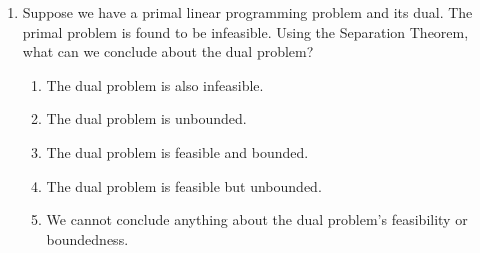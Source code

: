 \documentclass{article}%
\begin{document}
\begin{enumerate}
\begin{enumerate}
\item The dual problem must have an unbounded objective function.%
\item The dual problem must have a unique optimal solution.%
\item The dual problem must be either infeasible or have an unbounded objective function.%
\item The dual problem must have a finite optimal objective function value.%
\end{enumerate}%
\vspace{1em}%
\item Suppose we have a primal linear programming problem and its dual.  The primal problem is found to be infeasible. Using the Separation Theorem, what can we conclude about the dual problem?%
\begin{enumerate}%
\item The dual problem is also infeasible.%
\item The dual problem is unbounded.%
\item The dual problem is feasible and bounded.%
\item The dual problem is feasible but unbounded.%
\item We cannot conclude anything about the dual problem's feasibility or boundedness.%
\end{enumerate}%
\vspace{1em}%
\end{enumerate}

%
\newpage%
\end{document}
